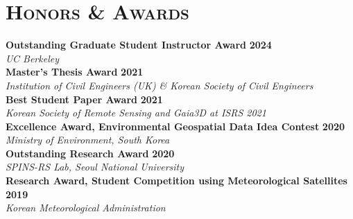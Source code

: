 \newcommand{\award}[2]
  {\small \textbf{\color{maincolor} #1}
  \hfill \textbf{{\color{hlcolor-0} #2}}}
  
\newcommand{\scholarshiptext}[1]
  {\small \color{hlcolor-0} \emph{#1}}
  
\section*{\textsc{Honors \& Awards}}
\begin{cvcontent}
  \award{Outstanding Graduate Student Instructor Award}{2024}\\[0.5mm]
  \scholarshiptext{UC Berkeley}\\[0.5mm]
  \award{Master’s Thesis Award}{2021}\\[0.5mm]
  \scholarshiptext{Institution of Civil Engineers (UK) \& Korean Society of Civil Engineers}\\[0.5mm]
  \award{Best Student Paper Award}{2021}\\[0.5mm]
  \scholarshiptext{Korean Society of Remote Sensing and Gaia3D at ISRS 2021} \\[0.5mm]
  \award{Excellence Award, Environmental Geospatial Data Idea Contest}{2020}\\[0.5mm]
  \scholarshiptext{Ministry of Environment, South Korea}\\[0.5mm]
  \award{Outstanding Research Award}{2020}\\[0.5mm]
  \scholarshiptext{SPINS-RS Lab, Seoul National University}\\[0.5mm]
  \award{Research Award, Student Competition using Meteorological Satellites}{2019}\\[0.5mm]
  \scholarshiptext{Korean Meteorological Administration}
\end{cvcontent}